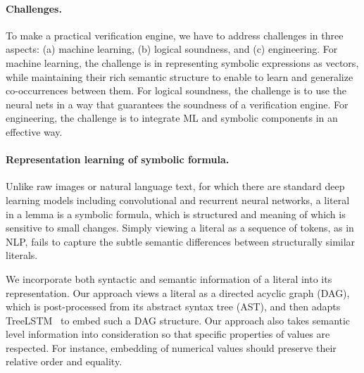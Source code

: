 \paragraph{Challenges.}
To make \dpy a practical verification engine, we have to address challenges in
three aspects: (a) machine learning, (b) logical soundness, and (c) engineering. For
machine learning, the challenge is in representing symbolic expressions as
vectors, while maintaining their rich semantic structure to enable to learn and
generalize co-occurrences between them. For logical soundness, the challenge is to use the neural nets
in a way that guarantees the soundness of a verification engine.
For engineering, the challenge is to
integrate ML and symbolic components in an effective way.

\paragraph{Representation learning of symbolic formula.}
Unlike raw images or natural language text, for which there are standard deep
learning models including convolutional and recurrent neural networks, a literal
in a lemma is a symbolic formula, which is structured and meaning of which is
sensitive to small changes. Simply viewing a literal as a sequence of tokens, as
in NLP, fails to capture the subtle semantic differences between structurally
similar literals.
    
    
We incorporate both syntactic and semantic information of a literal into its
representation. Our approach views a literal as a directed acyclic graph (DAG),
which is post-processed from its abstract syntax tree (AST), and
then adapts TreeLSTM~\cite{TreeLSTM} to embed such a DAG structure. Our approach
also takes semantic level information into consideration so that specific
properties of values are respected. For instance, embedding of numerical
values should preserve their relative order and equality.
    



